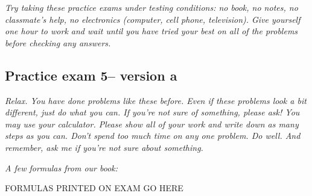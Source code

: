 \documentclass[12pt]{article}
\begin{document}
\emph{Try taking these practice exams under testing conditions:  no book, no notes, no classmate's help, no electronics (computer, cell phone, television). Give yourself one hour to work and wait until you have tried your best on all of the problems before checking any answers.}
\bigskip

\subsection*{Practice exam 5-- version a}
\bigskip
 \emph{Relax.  You have done problems like these before.  Even if these problems look a bit different, just do what you can.  If you're not sure of something, please ask! You may use your calculator.  Please show all of your work and write down as many steps as you can.  Don't spend too much time on any one problem.  Do well.  And remember, ask me if you're not sure about something.}
 
\bigskip
 
\emph{A few formulas from our book:}

\begin{center}

FORMULAS PRINTED ON EXAM GO HERE

\end{center}

\hspace{-.25in} \hrulefill
\end{document}
